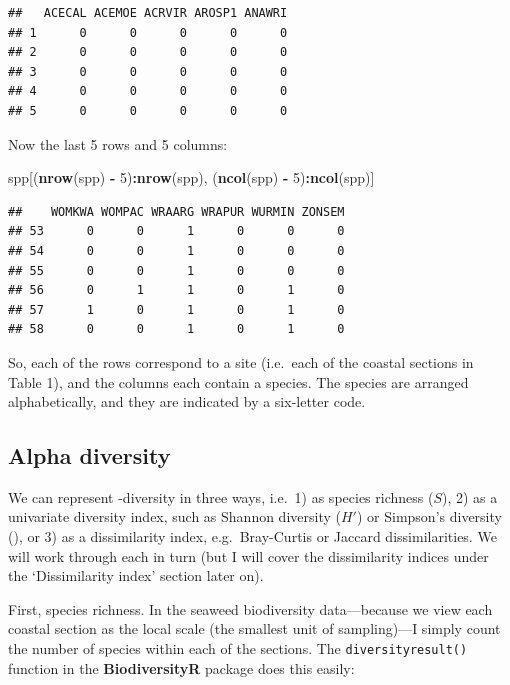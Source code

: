 \documentclass[10pt,a4,]{article}
\newenvironment{Shaded}{\begin{snugshade}}{\end{snugshade}}
\newcommand{\DecValTok}[1]{\textcolor[rgb]{0.00,0.00,0.81}{#1}}
\newcommand{\KeywordTok}[1]{\textcolor[rgb]{0.13,0.29,0.53}{\textbf{#1}}}
\newcommand{\NormalTok}[1]{#1}
\newcommand{\OperatorTok}[1]{\textcolor[rgb]{0.81,0.36,0.00}{\textbf{#1}}}
\newcommand{\StringTok}[1]{\textcolor[rgb]{0.31,0.60,0.02}{#1}}
\begin{document}
\begin{verbatim}
##   ACECAL ACEMOE ACRVIR AROSP1 ANAWRI
## 1      0      0      0      0      0
## 2      0      0      0      0      0
## 3      0      0      0      0      0
## 4      0      0      0      0      0
## 5      0      0      0      0      0
\end{verbatim}

Now the last 5 rows and 5 columns:

\begin{Shaded}
\begin{Highlighting}[]
\NormalTok{spp[(}\KeywordTok{nrow}\NormalTok{(spp) }\OperatorTok{{-}}\StringTok{ }\DecValTok{5}\NormalTok{)}\OperatorTok{:}\KeywordTok{nrow}\NormalTok{(spp), (}\KeywordTok{ncol}\NormalTok{(spp) }\OperatorTok{{-}}\StringTok{ }\DecValTok{5}\NormalTok{)}\OperatorTok{:}\KeywordTok{ncol}\NormalTok{(spp)]}
\end{Highlighting}
\end{Shaded}

\begin{verbatim}
##    WOMKWA WOMPAC WRAARG WRAPUR WURMIN ZONSEM
## 53      0      0      1      0      0      0
## 54      0      0      1      0      0      0
## 55      0      0      1      0      0      0
## 56      0      1      1      0      1      0
## 57      1      0      1      0      1      0
## 58      0      0      1      0      1      0
\end{verbatim}

So, each of the rows correspond to a site (i.e.~each of the coastal
sections in Table 1), and the columns each contain a species. The
species are arranged alphabetically, and they are indicated by a
six-letter code.

\subsection{Alpha diversity}

We can represent \textalpha-diversity in three ways, i.e.~1) as species
richness (\(S\)), 2) as a univariate diversity index, such as Shannon
diversity (\(H'\)) or Simpson's diversity (\textlambda), or 3) as a
dissimilarity index, e.g.~Bray-Curtis or Jaccard dissimilarities. We
will work through each in turn (but I will cover the dissimilarity
indices under the `Dissimilarity index' section later on).

First, species richness. In the seaweed biodiversity data---because we
view each coastal section as the local scale (the smallest unit of
sampling)---I simply count the number of species within each of the
sections. The \texttt{diversityresult()} function in the
\textbf{BiodiversityR} package does this easily:
\end{document}
